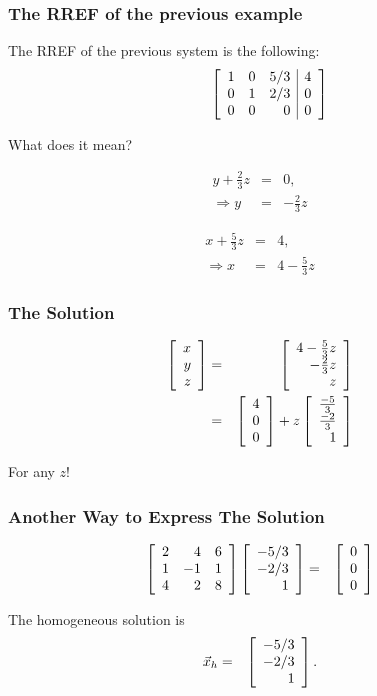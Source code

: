 \begin{frame}
  \frametitle{The RREF of the previous example}

  The RREF of the previous system is the following:
  \begin{eqnarray*}
    \stateThree{~}{~}{~}
    \startRowOps
    \oneRowOps{1}{0}{5/3}{4} 
    \oneRowOps{0}{1}{2/3}{0} 
    \oneRowOps{0}{0}{0}{0} 
    \stopRowOps    
  \end{eqnarray*}

  What does it mean?

  \begin{eqnarray*}
    y + \frac{2}{3}z & = & 0, \\
    \Rightarrow y & = & -\frac{2}{3} z
  \end{eqnarray*}

  {
    \begin{eqnarray*}
      x + \frac{5}{3} z & = & 4, \\
      \Rightarrow x & = & 4 - \frac{5}{3} z
    \end{eqnarray*}
  }

\end{frame}

\begin{frame}
  \frametitle{The Solution}

  \begin{eqnarray*}
    \left[ \begin{array}{r} x \\ y \\ z \end{array} \right] & = & \left[ \begin{array}{r} 4 - \frac{5}{3}z \\ -\frac{2}{3}z \\ z \end{array} \right] \\
    & = & \left[ \begin{array}{r} 4 \\ 0 \\ 0 \end{array} \right] + z \left[ \begin{array}{r} \frac{-5}{3} \\ \frac{-2}{3} \\ 1 \end{array} \right]
  \end{eqnarray*}

  For any $z$!
  
\end{frame}

\begin{frame}
  \frametitle{Another Way to Express The Solution}
  
  \begin{eqnarray*}
    \left[ \begin{array}{rrr} 2 & 4 & 6 \\ 1 & -1 & 1 \\ 4 & 2 & 8 \end{array} \right] \left[ \begin{array}{r} -5/3 \\ -2/3 \\ 1 \end{array} \right] 
    & = & \left[ \begin{array}{r} 0 \\ 0 \\ 0 \end{array} \right]
  \end{eqnarray*}

  The homogeneous solution is 
  \begin{eqnarray*}
    \vec{x}_h & = & \left[ \begin{array}{r} -5/3 \\ -2/3 \\ 1 \end{array} \right]. 
  \end{eqnarray*}

\end{frame}

